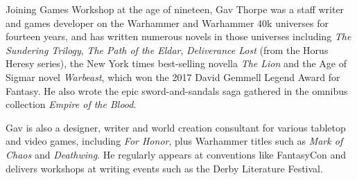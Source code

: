 Joining Games Workshop at the age of nineteen, Gav Thorpe was a staff writer and games developer on the Warhammer and Warhammer 40k universes for fourteen years, and has written numerous novels in those universes including \emph{The Sundering Trilogy}, \emph{The Path of the Eldar}, \emph{Deliverance Lost} (from the Horus Heresy series), the New York times best-selling novella \emph{The Lion} and the Age of Sigmar novel \emph{Warbeast}, which won the 2017 David Gemmell Legend Award for Fantasy. He also wrote the epic sword-and-sandals saga gathered in the omnibus collection \emph{Empire of the Blood}.

Gav is also a designer, writer and world creation consultant for various tabletop and video games, including \emph{For Honor}, plus Warhammer titles such as \emph{Mark of Chaos} and \emph{Deathwing}. He regularly appears at conventions like FantasyCon and delivers workshops at writing events such as the Derby Literature Festival.